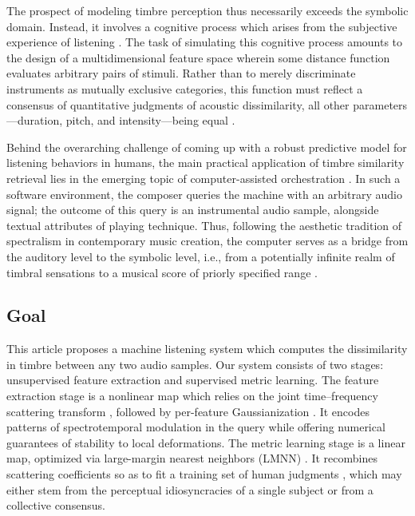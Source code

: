 \documentclass{bmcart}
\makeatletter
\newcommand*{\ie}{i.e.,\@\xspace}
\makeatother
\begin{document}
The prospect of modeling timbre perception thus necessarily exceeds the symbolic domain.
Instead, it involves a cognitive process which arises from the subjective experience of listening \cite{erickson1975book}.
The task of simulating this cognitive process amounts to the design of a multidimensional feature space wherein some distance function evaluates arbitrary pairs of stimuli.
Rather than to merely discriminate instruments as mutually exclusive categories, this function must reflect a consensus of quantitative judgments of acoustic dissimilarity, all other parameters---duration, pitch, and intensity---being equal \cite{thoret2018jasa}.

Behind the overarching challenge of coming up with a robust predictive model for listening behaviors in humans, the main practical application of timbre similarity retrieval lies in the emerging topic of computer-assisted orchestration \cite{maresz2013cmr}.
In such a software environment, the composer queries the machine with an arbitrary audio signal; the outcome of this query is an instrumental audio sample, alongside textual attributes of playing technique.
Thus, following the aesthetic tradition of spectralism in contemporary music creation, the computer serves as a bridge from the auditory level to the symbolic level, \ie{} from a potentially infinite realm of timbral sensations to a musical score of priorly specified range \cite{caetano2019swarm}.

\subsection*{Goal}
This article proposes a machine listening system which computes the dissimilarity in timbre between any two audio samples.
Our system consists of two stages: unsupervised feature extraction and supervised metric learning.
The feature extraction stage is a nonlinear map which relies on the joint time--frequency scattering transform \cite{anden2015mlsp}, followed by per-feature Gaussianization \cite{lostanlen2018jasmp}.
It encodes patterns of spectrotemporal modulation in the query while offering numerical guarantees of stability to local deformations.
The metric learning stage is a linear map, optimized via large-margin nearest neighbors (LMNN) \cite{weinberger2009distance}.
It recombines scattering coefficients so as to fit a training set of human judgments \cite{mcadams1995psychres}, which may either stem from the perceptual idiosyncracies of a single subject or from a collective consensus.
\end{document}
